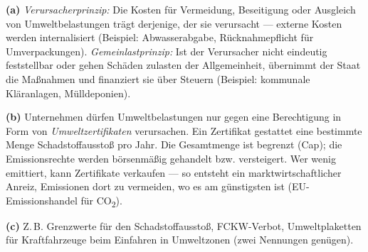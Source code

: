 \documentclass[11pt, a4paper]{article}
\begin{document}
\begin{loesung}[title={Lösung Aufgabe~7 --- Umweltpolitik}]
\textbf{(a)} \emph{Verursacherprinzip:} Die Kosten für Vermeidung, Beseitigung oder
Ausgleich von Umweltbelastungen trägt derjenige, der sie verursacht --- externe Kosten
werden internalisiert (Beispiel: Abwasserabgabe, Rücknahmepflicht für Umverpackungen).
\emph{Gemeinlastprinzip:} Ist der Verursacher nicht eindeutig feststellbar oder gehen
Schäden zulasten der Allgemeinheit, übernimmt der Staat die Maßnahmen und finanziert sie
über Steuern (Beispiel: kommunale Kläranlagen, Mülldeponien).

\textbf{(b)} Unternehmen dürfen Umweltbelastungen nur gegen eine Berechtigung in Form von
\emph{Umweltzertifikaten} verursachen. Ein Zertifikat gestattet eine bestimmte Menge
Schadstoffausstoß pro Jahr. Die Gesamtmenge ist begrenzt (Cap); die Emissionsrechte werden
börsenmäßig gehandelt bzw. versteigert. Wer wenig emittiert, kann Zertifikate verkaufen ---
so entsteht ein marktwirtschaftlicher Anreiz, Emissionen dort zu vermeiden, wo es am
günstigsten ist (EU-Emissionshandel für CO\textsubscript{2}).

\textbf{(c)} Z.\,B. Grenzwerte für den Schadstoffausstoß, FCKW-Verbot, Umweltplaketten
für Kraftfahrzeuge beim Einfahren in Umweltzonen (zwei Nennungen genügen).
\end{loesung}
\end{document}
